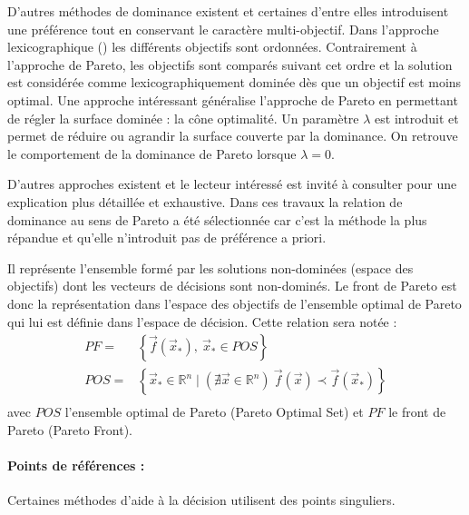 
D’autres méthodes de dominance existent et certaines d’entre elles introduisent
une préférence tout en conservant le caractère multi-objectif.
Dans l’approche lexicographique () les différents objectifs
sont ordonnées. Contrairement à l’approche de Pareto, les objectifs sont comparés
suivant cet ordre et la solution est considérée comme lexicographiquement dominée dès
que un objectif est moins optimal.
Une approche intéressant généralise l’approche de Pareto en permettant de régler
la surface dominée : la cône optimalité. Un paramètre $\lambda$ est introduit et
permet de réduire ou agrandir la surface couverte par la dominance. On retrouve le
comportement de la dominance de Pareto lorsque $\lambda = 0$.

D’autres approches existent et le lecteur intéressé est invité à consulter \cite{Collette2002}
pour une explication plus détaillée et exhaustive. Dans ces travaux la relation de
dominance au sens de Pareto a été sélectionnée car c’est la méthode la plus répandue
et qu’elle n’introduit pas de préférence a priori.

\begin{Def}\label{def:front_de_pareto}
Il représente l’ensemble formé par les solutions non-dominées (espace des objectifs)
dont les vecteurs de décisions sont non-dominés.
Le front de Pareto est donc la représentation dans l’espace des objectifs
de l’ensemble optimal de Pareto qui lui est définie dans l’espace de décision.
Cette relation sera notée :
\begin{equation}
  \begin{aligned}
    PF   =& \left\{ \vec{f}(\vec{x}_{*}), \  \vec{x}_{*} \in POS \right\} \\
    POS  =& \left\{ \vec{x}_{*} \in \mathbb{R}^{n} \mid (\nexists \vec{x} \in \mathbb{R}^{n}) \  \vec{f}(\vec{x}) \prec \vec{f}(\vec{x}_{*}) \right\} \\
  \end{aligned}
\end{equation}
avec $POS$ l’ensemble optimal de Pareto (Pareto Optimal Set) et $PF$ le front de Pareto
(Pareto Front).
\end{Def}

\paragraph{Points de références : } %
\label{par:points_de_references}
Certaines méthodes d’aide à la décision utilisent des points singuliers.

